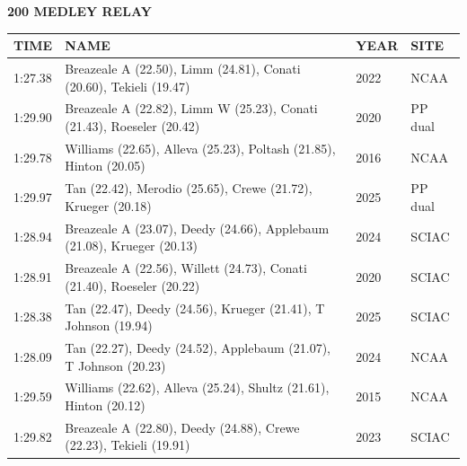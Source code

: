 \begin{table}[H]
\centering
\begin{minipage}[t]{0.6\textwidth}
\centering
\textbf{200 MEDLEY RELAY}\\[0.1cm]
\begin{tabular}{@{}p{1.8cm}p{2.8cm}p{1.2cm}p{1.4cm}@{}}
\hline
    \textbf{TIME} & \textbf{NAME} & \textbf{YEAR} & \textbf{SITE} \\
\hline
    1:27.38 & Breazeale A (22.50), Limm (24.81), Conati (20.60), Tekieli (19.47) & 2022 & NCAA \\
    1:29.90 & Breazeale A (22.82), Limm W (25.23), Conati (21.43), Roeseler (20.42) & 2020 & PP dual \\
    1:29.78 & Williams (22.65), Alleva (25.23), Poltash (21.85), Hinton (20.05) & 2016 & NCAA \\
    1:29.97 & Tan (22.42), Merodio (25.65), Crewe (21.72), Krueger (20.18) & 2025 & PP dual \\
    1:28.94 & Breazeale A (23.07), Deedy (24.66), Applebaum (21.08), Krueger (20.13) & 2024 & SCIAC \\
    1:28.91 & Breazeale A (22.56), Willett (24.73), Conati (21.40), Roeseler (20.22) & 2020 & SCIAC \\
    1:28.38 & Tan (22.47), Deedy (24.56), Krueger (21.41), T Johnson (19.94) & 2025 & SCIAC \\
    1:28.09 & Tan (22.27), Deedy (24.52), Applebaum (21.07), T Johnson (20.23) & 2024 & NCAA \\
    1:29.59 & Williams (22.62), Alleva (25.24), Shultz (21.61), Hinton (20.12) & 2015 & NCAA \\
    1:29.82 & Breazeale A (22.80), Deedy (24.88), Crewe (22.23), Tekieli (19.91) & 2023 & SCIAC \\
\hline
\end{tabular}
\end{minipage}
\end{table}

